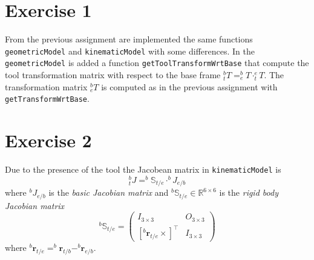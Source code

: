 \section{Exercise 1} \label{P1}

From the previous assignment are implemented the same functions \verb*|geometricModel| and \verb*|kinematicModel| with some differences.
In the \verb*|geometricModel| is added a function \verb*|getToolTransformWrtBase| that compute the tool transformation matrix with respect to the base frame $^b_t T = ^b_e T \cdot ^e_t T$. The transformation matrix $^b_e T$ is computed as in the previous assignment with \verb*|getTransformWrtBase|.

\section{Exercise 2}
Due to the presence of the tool the Jacobean matrix in \verb*|kinematicModel| is
\begin{equation} \label{E1}
	^b_t J = ^b \mathbb{S}_{t/e} \cdot ^b J_{e/b}
\end{equation}
where $^b J_{e/b}$ is the \textit{basic Jacobian matrix} and $^b \mathbb{S}_{t/e} \in \mathbb{R}^{6\times6}$ is the \textit{rigid body Jacobian matrix} 
\begin{equation*}
	^b \mathbb{S}_{t/e} = \begin{pmatrix}
		I_{3\times 3} & O_{3\times 3}  \\
		[^b \mathbf{r}_{t/e}\times]^\top & I_{3\times 3}
	\end{pmatrix}
\end{equation*}
where $^b \mathbf{r}_{t/e} = ^b \mathbf{r}_{t/b} - ^b \mathbf{r}_{e/b}$.

